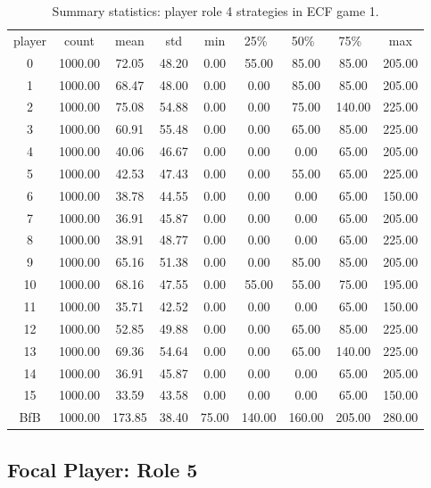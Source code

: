 \documentclass[11pt, oneside]{article}   	%
\begin{document}
\begin{table}[h]
\figtop

\centering
\begin{tabular}{ccccccccc}
 player & count & mean & std & min & 25\%\ & 50\%\ & 75\%\ & max \\ 
0 & 1000.00 & 72.05 & 48.20 & 0.00 & 55.00 & 85.00 & 85.00 & 205.00 \\ 
1 & 1000.00 & 68.47 & 48.00 & 0.00 & 0.00 & 85.00 & 85.00 & 205.00 \\ 
2 & 1000.00 & 75.08 & 54.88 & 0.00 & 0.00 & 75.00 & 140.00 & 225.00 \\ 
3 & 1000.00 & 60.91 & 55.48 & 0.00 & 0.00 & 65.00 & 85.00 & 225.00 \\ 
4 & 1000.00 & 40.06 & 46.67 & 0.00 & 0.00 & 0.00 & 65.00 & 205.00 \\ 
5 & 1000.00 & 42.53 & 47.43 & 0.00 & 0.00 & 55.00 & 65.00 & 225.00 \\ 
6 & 1000.00 & 38.78 & 44.55 & 0.00 & 0.00 & 0.00 & 65.00 & 150.00 \\ 
7 & 1000.00 & 36.91 & 45.87 & 0.00 & 0.00 & 0.00 & 65.00 & 205.00 \\ 
8 & 1000.00 & 38.91 & 48.77 & 0.00 & 0.00 & 0.00 & 65.00 & 225.00 \\ 
9 & 1000.00 & 65.16 & 51.38 & 0.00 & 0.00 & 85.00 & 85.00 & 205.00 \\ 
10 & 1000.00 & 68.16 & 47.55 & 0.00 & 55.00 & 55.00 & 75.00 & 195.00 \\ 
11 & 1000.00 & 35.71 & 42.52 & 0.00 & 0.00 & 0.00 & 65.00 & 150.00 \\ 
12 & 1000.00 & 52.85 & 49.88 & 0.00 & 0.00 & 65.00 & 85.00 & 225.00 \\ 
13 & 1000.00 & 69.36 & 54.64 & 0.00 & 0.00 & 65.00 & 140.00 & 225.00 \\ 
14 & 1000.00 & 36.91 & 45.87 & 0.00 & 0.00 & 0.00 & 65.00 & 205.00 \\ 
15 & 1000.00 & 33.59 & 43.58 & 0.00 & 0.00 & 0.00 & 65.00 & 150.00 \\ 
BfB & 1000.00 & 173.85 & 38.40 & 75.00 & 140.00 & 160.00 & 205.00 & 280.00 \\ 
 \end{tabular}
\caption{Summary statistics: player role 4 strategies in ECF game 1.}
\label{table:summary_game1_role4}
\figbot
\end{table}

\newpage\clearpage
\subsection{Focal Player: Role 5}
\end{document}
